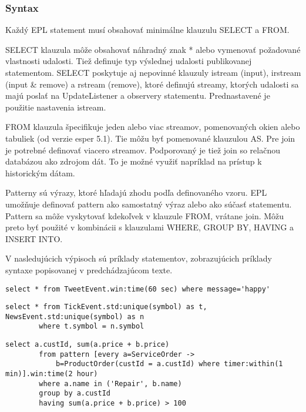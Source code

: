 		\subsubsection{Syntax}
		Každý EPL statement musí obsahovať minimálne klauzulu SELECT a FROM.

		SELECT klauzula môže obsahovať náhradný znak * alebo vymenovať požadované vlastnosti udalosti. Tiež definuje typ výslednej udalosti publikovanej statementom. SELECT poskytuje aj nepovinné klauzuly istream (input), irstream (input \& remove) a rstream (remove), ktoré definujú streamy, ktorých udalosti sa majú poslať na UpdateListener a observery statementu. Prednastavené je použitie nastavenia istream.
		
		FROM klauzula špecifikuje jeden alebo viac streamov, pomenovaných okien alebo tabuliek (od verzie esper 5.1). Tie môžu byť pomenované klauzulou AS. Pre join je potrebné definovať viacero streamov. Podporovaný je tiež join so relačnou databázou ako zdrojom dát. To je možné využiť napríklad na prístup k historickým dátam.

		Patterny sú výrazy, ktoré hľadajú zhodu podľa definovaného vzoru. EPL umožňuje definovať pattern ako samostatný výraz alebo ako súčasť statementu. Pattern sa môže vyskytovať kdekoľvek v klauzule FROM, vrátane join. Môžu preto byť použité v kombinácii s klauzulami WHERE, GROUP BY, HAVING a INSERT INTO.

		V nasledujúcich výpisoch sú príklady statementov, zobrazujúcich príklady syntaxe popisovanej v predchádzajúcom texte.
				
		\begin{lstlisting}[label=lst:epl-simple,caption=Jednoduchý EPL statement]
		select * from TweetEvent.win:time(60 sec) where message='happy'
		\end{lstlisting}
		
		\begin{lstlisting}[label=lst:epl-join,caption=Jednoduchý EPL statements použitím join]
		select * from TickEvent.std:unique(symbol) as t, NewsEvent.std:unique(symbol) as n
		where t.symbol = n.symbol
		\end{lstlisting}
		
		\begin{lstlisting}[label=lst:epl-pattern,caption=EPL statement s použitím patternu]
		select a.custId, sum(a.price + b.price)
		from pattern [every a=ServiceOrder -> 
			b=ProductOrder(custId = a.custId) where timer:within(1 min)].win:time(2 hour) 
		where a.name in ('Repair', b.name)
		group by a.custId
		having sum(a.price + b.price) > 100
		\end{lstlisting}
				
